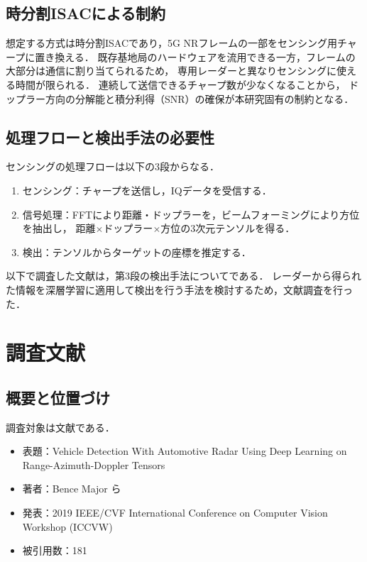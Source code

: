 \documentclass[a4paper,10.5pt,dvipdfmx]{jsarticle}
\begin{document}
\subsection{時分割ISACによる制約}
\label{sec:constraint}

想定する方式は時分割ISACであり，5G NRフレームの一部をセンシング用チャープに置き換える．
既存基地局のハードウェアを流用できる一方，フレームの大部分は通信に割り当てられるため，
専用レーダーと異なりセンシングに使える時間が限られる．
連続して送信できるチャープ数が少なくなることから，
ドップラー方向の分解能と積分利得（SNR）の確保が本研究固有の制約となる．

\subsection{処理フローと検出手法の必要性}

センシングの処理フローは以下の3段からなる．

\begin{enumerate}
  \item センシング：チャープを送信し，IQデータを受信する．
  \item 信号処理：FFTにより距離・ドップラーを，ビームフォーミングにより方位を抽出し，
        距離$\times$ドップラー$\times$方位の3次元テンソルを得る．
  \item 検出：テンソルからターゲットの座標を推定する．
\end{enumerate}

以下で調査した文献は，第3段の検出手法についてである．
レーダーから得られた情報を深層学習に適用して検出を行う手法を検討するため，文献調査を行った．

\section{調査文献}
\label{sec:paper}

\subsection{概要と位置づけ}

調査対象は文献\cite{9022248}である．

\begin{itemize}
  \item 表題：Vehicle Detection With Automotive Radar Using Deep Learning on
        Range-Azimuth-Doppler Tensors
  \item 著者：Bence Major ら
  \item 発表：2019 IEEE/CVF International Conference on Computer Vision Workshop (ICCVW)
  \item 被引用数：181
\end{itemize}
\end{document}
